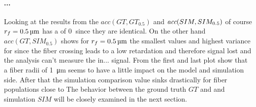 \paragraph{...}
Looking at the results from the $acc(GT,GT_{0.5})$ and $\textit{acc}{}(SIM,SIM_{0.5})$ of course $\fiberRadius=\SI{0.5}{\micro\meter}$ has a \acc{} of $\SI{0}{}$ since they are identical.
On the other hand $acc(GT,SIM_{0.5})$ shows for $\fiberRadius=\SI{0.5}{\micro\meter}$ the smallest values and highest variance for \acc{} since the fiber crossing leads to a low retardation and therefore signal lost and the analysis can't measure the in... signal.
% 
From the first and last plot show that a fiber radii of \SI{1}{\micro\meter} seems to have a little impact on the model and simulation side.
After that the simulation comparison \acc{} value sinks drastically for fiber populations close to %
% 
The behavior between the ground truth $GT$ and and simulation $SIM$ will be closely examined in the next section.
% 
% 
% 
